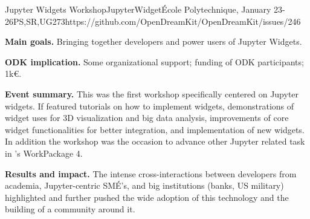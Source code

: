 \begin{event}{Jupyter Widgets Workshop}{JupyterWidget}{École Polytechnique, January 23-26}{PS,SR,UG}{27}{3}{https://github.com/OpenDreamKit/OpenDreamKit/issues/246}

\textbf{Main goals.} Bringing together developers and power users of Jupyter Widgets.

\textbf{ODK implication.} Some organizational support; funding of ODK participants; \approx 1k€.

\textbf{Event summary.} This was the first workshop specifically
centered on Jupyter widgets. If featured tutorials on how to implement
widgets, demonstrations of widget uses for 3D visualization and big
data analysis, improvements of core widget functionalities for better
integration, and implementation of new widgets. In addition the
workshop was the occasion to advance other Jupyter related task in
\ODK's WorkPackage 4.

\textbf{Results and impact.} The intense cross-interactions between
developers from academia, Jupyter-centric SMÉ's, and big institutions
(banks, US military) highlighted and further pushed the wide adoption
of this technology and the building of a community around it.
\end{event}
